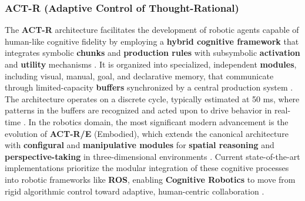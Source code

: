 \documentclass[a4paper]{article}
\begin{document}
\subsubsection{ACT-R (Adaptive Control of Thought-Rational)}
The \textbf{ACT-R} architecture facilitates the development of robotic agents capable of human-like cognitive fidelity by employing a \textbf{hybrid cognitive framework} that integrates symbolic \textbf{chunks} and \textbf{production rules} with subsymbolic \textbf{activation} and \textbf{utility} mechanisms \cite{anderson2004integrated, sun2006cognition}. It is organized into specialized, independent \textbf{modules}, including visual, manual, goal, and declarative memory, that communicate through limited-capacity \textbf{buffers} synchronized by a central production system \cite{ritter2019act, anderson2004integrated}. The architecture operates on a discrete cycle, typically estimated at 50 ms, where patterns in the buffers are recognized and acted upon to drive behavior in real-time \cite{anderson2004integrated}. In the robotics domain, the most significant modern advancement is the evolution of \textbf{ACT-R/E} (Embodied), which extends the canonical architecture with \textbf{configural} and \textbf{manipulative modules} for \textbf{spatial reasoning} and \textbf{perspective-taking} in three-dimensional environments \cite{trafton2013act, kennedy2007spatial}. Current state-of-the-art implementations prioritize the modular integration of these cognitive processes into robotic frameworks like \textbf{ROS}, enabling \textbf{Cognitive Robotics} to move from rigid algorithmic control toward adaptive, human-centric collaboration \cite{kurup2012can}.
\end{document}
